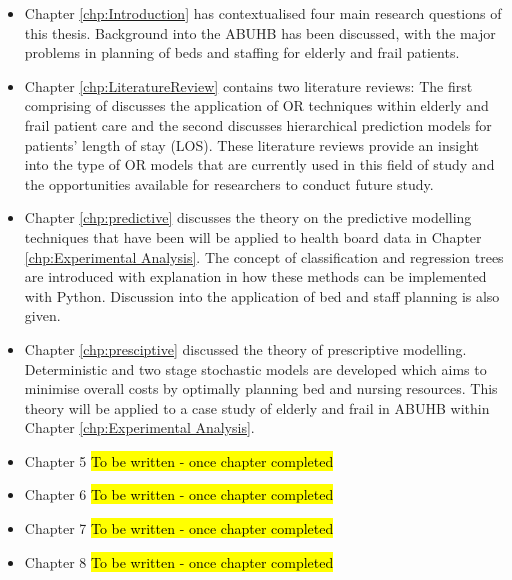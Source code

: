 \documentclass[../thesis.tex]{subfiles}
\begin{document}
\begin{itemize}
\item Chapter \ref{chp:Introduction} has contextualised four main research questions of this thesis. Background into the ABUHB has been discussed, with the major problems in planning of beds and staffing for elderly and frail patients.
    \item Chapter \ref{chp:LiteratureReview} contains two literature reviews: The first comprising of \cite{Williams} discusses the application of OR techniques within elderly and frail patient care and the second discusses hierarchical prediction models for patients' length of stay (LOS). These literature reviews provide an insight into the type of OR models that are currently used in this field of study and the opportunities available for researchers to conduct future study.
    
    \item Chapter \ref{chp:predictive} discusses the theory on the predictive modelling techniques that have been will be applied to health board data in Chapter \ref{chp:Experimental Analysis}. The concept of classification and regression trees are introduced with explanation in how these methods can be implemented with Python. Discussion into the application of bed and staff planning is also given.
    
    \item Chapter \ref{chp:presciptive} discussed the theory of prescriptive modelling. Deterministic and two stage stochastic models are developed which aims to minimise overall costs by optimally planning bed and nursing resources. This theory will be applied to a case study of elderly and frail in ABUHB within Chapter \ref{chp:Experimental Analysis}.

    
    \item Chapter 5 \hl{To be written - once chapter completed}    
    \item Chapter 6 \hl{To be written - once chapter completed}
    \item Chapter 7 \hl{To be written - once chapter completed}
    \item Chapter 8 \hl{To be written - once chapter completed}
    
\end{itemize}
\end{document}
